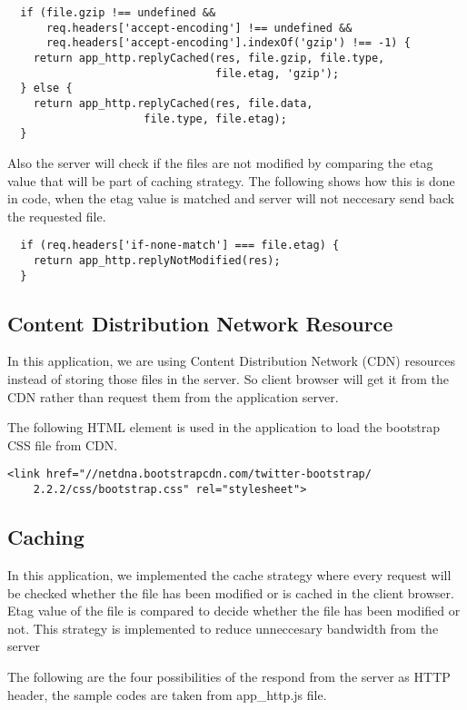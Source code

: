 \begin{lstlisting}
  if (file.gzip !== undefined && 
      req.headers['accept-encoding'] !== undefined && 
      req.headers['accept-encoding'].indexOf('gzip') !== -1) {
    return app_http.replyCached(res, file.gzip, file.type, 
                                file.etag, 'gzip');
  } else {
    return app_http.replyCached(res, file.data, 
                     file.type, file.etag);
  }
\end{lstlisting}

Also the server will check if the files are not modified by comparing the etag value that will be part of caching strategy. The following shows how this is done in code, when the etag value is matched and server will not neccesary send back the requested file.
 
\begin{lstlisting}
  if (req.headers['if-none-match'] === file.etag) {
    return app_http.replyNotModified(res);
  }
\end{lstlisting}

\subsection{Content Distribution Network Resource}
In this application, we are using Content Distribution Network (CDN) resources instead of storing those files in the server. So client browser will get it from the CDN rather than request them from the application server.  

The following HTML element is used in the application to load the bootstrap CSS file from CDN.
\begin{lstlisting}
<link href="//netdna.bootstrapcdn.com/twitter-bootstrap/
    2.2.2/css/bootstrap.css" rel="stylesheet">
\end{lstlisting}

\subsection{Caching}
In this application, we implemented the cache strategy where every request will be checked whether the file has been modified or is cached in the client browser. Etag value of the file is compared to decide whether the file has been modified or not. This strategy is implemented to reduce unneccesary bandwidth from the server

The following are the four possibilities of the respond from the server as HTTP header, the sample codes are taken from app{\_}http.js file. 

